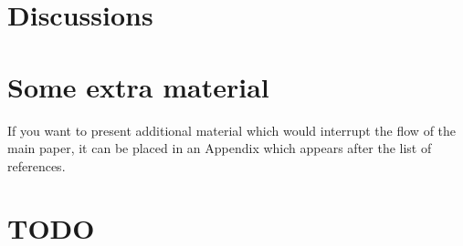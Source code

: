 \documentclass[fleqn,usenatbib]{mnras}
\begin{document}
\section{Discussions}










\appendix

\section{Some extra material}

If you want to present additional material which would interrupt the flow of the main paper,
it can be placed in an Appendix which appears after the list of references.


\clearpage

\section{TODO}
\listoftodos

\bsp	%
\label{lastpage}
\end{document}
